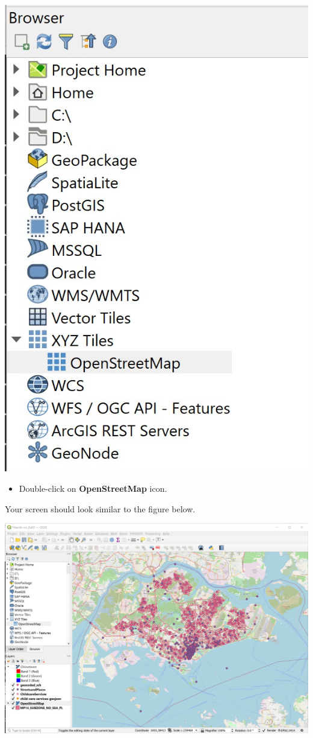 \documentclass[
  letterpaper,
  DIV=11,
  numbers=noendperiod]{scrreprt}
\providecommand{\tightlist}{%
  \setlength{\itemsep}{0pt}\setlength{\parskip}{0pt}}\usepackage{longtable,booktabs,array}
\begin{document}
\includegraphics{./img02/image29.jpg}

\begin{itemize}
\tightlist
\item
  Double-click on \textbf{OpenStreetMap} icon.
\end{itemize}

Your screen should look similar to the figure below.

\includegraphics{./img02/image30.jpg}
\end{document}
